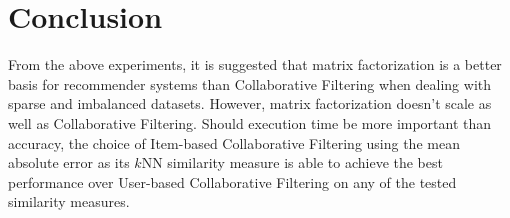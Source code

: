 \documentclass[11pt]{article}
\begin{document}
\section{Conclusion} \label{sec:conclusion}

From the above experiments, it is suggested that matrix factorization is a better basis for recommender systems than Collaborative Filtering when dealing with sparse and imbalanced datasets.
However, matrix factorization doesn't scale as well as Collaborative Filtering.
Should execution time be more important than accuracy, the choice of Item-based Collaborative Filtering using the mean absolute error as its $k$NN similarity measure is able to achieve the best performance over User-based Collaborative Filtering on any of the tested similarity measures.

%
\end{document}
